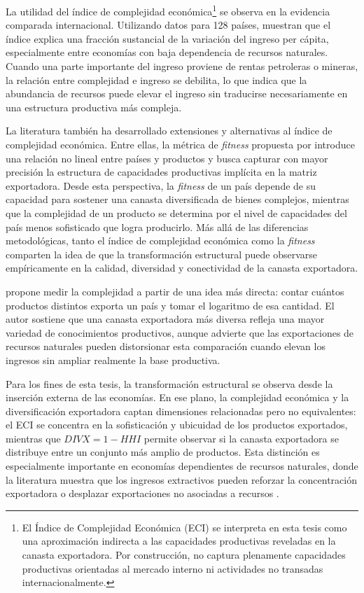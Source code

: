 \documentclass[../../PTFM.tex]{subfiles}
\begin{document}
	La utilidad del índice de complejidad económica\footnote{El Índice de Complejidad Económica (ECI) se interpreta en esta tesis como una aproximación indirecta a las capacidades productivas reveladas en la canasta exportadora. Por construcción, no captura plenamente capacidades productivas orientadas al mercado interno ni actividades no transadas internacionalmente.} se observa en la evidencia comparada internacional. Utilizando datos para 128 países, \textcite{Hausmann2014} muestran que el índice explica una fracción sustancial de la variación del ingreso per cápita, especialmente entre economías con baja dependencia de recursos naturales. Cuando una parte importante del ingreso proviene de rentas petroleras o mineras, la relación entre complejidad e ingreso se debilita, lo que indica que la abundancia de recursos puede elevar el ingreso sin traducirse necesariamente en una estructura productiva más compleja.
	
	La literatura también ha desarrollado extensiones y alternativas al índice de complejidad económica. Entre ellas, la métrica de \emph{fitness} propuesta por \textcite{Tacchella2012,Tacchella2013} introduce una relación no lineal entre países y productos y busca capturar con mayor precisión la estructura de capacidades productivas implícita en la matriz exportadora. Desde esta perspectiva, la \emph{fitness} de un país depende de su capacidad para sostener una canasta diversificada de bienes complejos, mientras que la complejidad de un producto se determina por el nivel de capacidades del país menos sofisticado que logra producirlo. Más allá de las diferencias metodológicas, tanto el índice de complejidad económica como la \emph{fitness} comparten la idea de que la transformación estructural puede observarse empíricamente en la calidad, diversidad y conectividad de la canasta exportadora.

	\textcite{Inoua2023} propone medir la complejidad a partir de una idea más directa: contar cuántos productos distintos exporta un país y tomar el logaritmo de esa cantidad. El autor sostiene que una canasta exportadora más diversa refleja una mayor variedad de conocimientos productivos, aunque advierte que las exportaciones de recursos naturales pueden distorsionar esta comparación cuando elevan los ingresos sin ampliar realmente la base productiva.
	
	Para los fines de esta tesis, la transformación estructural se observa desde la inserción externa de las economías. En ese plano, la complejidad económica y la diversificación exportadora captan dimensiones relacionadas pero no equivalentes: el ECI se concentra en la sofisticación y ubicuidad de los productos exportados, mientras que $DIVX=1-HHI$ permite observar si la canasta exportadora se distribuye entre un conjunto más amplio de productos. Esta distinción es especialmente importante en economías dependientes de recursos naturales, donde la literatura muestra que los ingresos extractivos pueden reforzar la concentración exportadora o desplazar exportaciones no asociadas a recursos \parencite{Harding2016,Bahar2018}.
	
\end{document}
